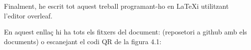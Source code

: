 Finalment, he escrit tot aquest treball programant-ho en \LaTeX \space i utilitzant l'editor overleaf. 

En aquest enllaç hi ha tots els fitxers del document: (reposetori a github amb els documents) o escanejant el codi QR de la figura 4.1:
